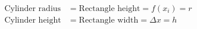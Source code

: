 \documentclass[preview]{standalone}
\begin{document}
\begin{align*}
\text{Cylinder radius}&=\text{Rectangle height}=f(x_i)=r \\\text{Cylinder height}&=\text{Rectangle width}=\Delta x=h
\end{align*}
\end{document}
